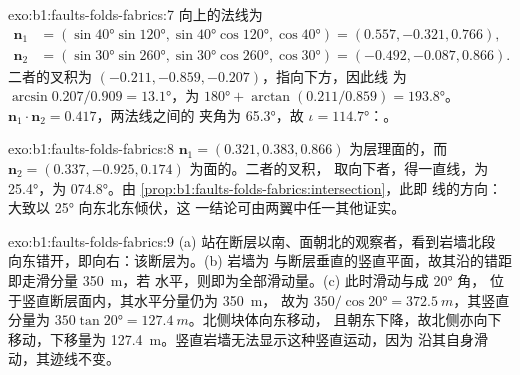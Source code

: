 \begin{solution}{exo:b1:faults-folds-fabrics:7}
向上的法线为
\begin{align*}
  \mathbf n_1 &= (\sin\ang{40}\sin\ang{120}, \sin\ang{40}\cos\ang{120}, \cos\ang{40}) = (0.557, -0.321, 0.766),\\
  \mathbf n_2 &= (\sin\ang{30}\sin\ang{260}, \sin\ang{30}\cos\ang{260}, \cos\ang{30}) = (-0.492, -0.087, 0.866).
\end{align*}
二者的叉积为
$(-0.211, -0.859, -0.207)$，指向下方，因此线
为 $\arcsin 0.207/0.909 = \ang{13.1}$，为 $\ang{180} + \arctan(0.211/0.859) =
\ang{193.8}$。$\mathbf n_1\cdot\mathbf n_2 = 0.417$，两法线之间的
夹角为 \ang{65.3}，故 $\iota = \ang{114.7}$：。
\end{solution}

\begin{solution}{exo:b1:faults-folds-fabrics:8}
$\mathbf n_1 = (0.321, 0.383, 0.866)$ 为层理面的，而
$\mathbf n_2 = (0.337, -0.925, 0.174)$ 为面的。二者的叉积，
取向下者，得一直线，为 \ang{25.4}，为 \ang{074.8}。由
\cref{prop:b1:faults-folds-fabrics:intersection}，此即
线的方向：大致以 \ang{25} 向东北东倾伏，这
一结论可由两翼中任一其他证实。
\end{solution}

\begin{solution}{exo:b1:faults-folds-fabrics:9}
(a) 站在断层以南、面朝北的观察者，看到岩墙北段
向东错开，即向右：该断层为。(b) 岩墙为
与断层垂直的竖直平面，故其沿的错距
即走滑分量 \qty{350}{m}，若
水平，则即为全部滑动量。(c) 此时滑动与成 \ang{20} 角，
位于竖直断层面内，其水平分量仍为 \qty{350}{m}，
故为 $350/\cos\ang{20} = \qty{372.5}{m}$，其竖直
分量为 $350\tan\ang{20} = \qty{127.4}{m}$。北侧块体向东移动，
且朝东下降，故北侧亦向下移动，下移量为
\qty{127.4}{m}。竖直岩墙无法显示这种竖直运动，因为
沿其自身滑动，其迹线不变。
\end{solution}

